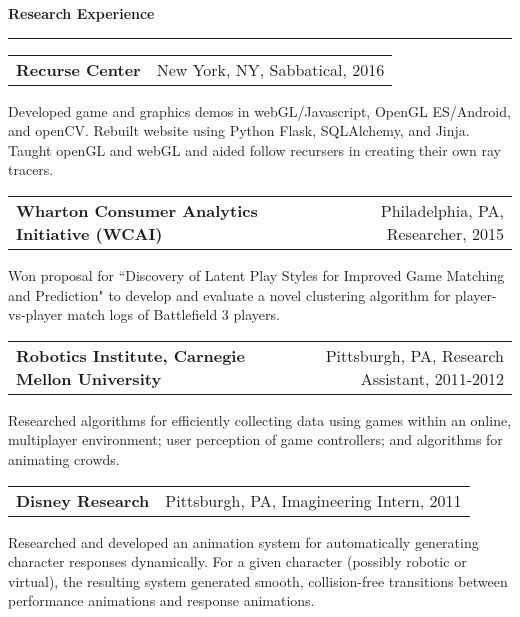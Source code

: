 \needspace{6em}
{\Large {\bf Research Experience}} 
\vspace{0.1cm}
\hrule
\medskip

\needspace{6em}
\begin{tabular*}{7.1in}{@{}l@{\extracolsep\fill}r}
{\large {\bf Recurse Center}} & New York, NY, Sabbatical, 2016\\
\end{tabular*}
Developed game and graphics demos in webGL/Javascript, OpenGL ES/Android, and openCV. Rebuilt website using Python Flask, SQLAlchemy, and Jinja. Taught openGL and webGL and aided follow recursers in creating their own ray tracers.

\medskip


\needspace{6em}
\begin{tabular*}{7.1in}{@{}l@{\extracolsep\fill}r}
   {\large {\bf Wharton Consumer Analytics Initiative (WCAI)}} & Philadelphia, PA, Researcher, 2015\\
\end{tabular*}

Won proposal for ``Discovery of Latent Play Styles for Improved Game Matching and Prediction" to develop and evaluate a novel clustering algorithm for player-vs-player match logs of Battlefield 3 players.

\medskip


\needspace{6em}
\begin{tabular*}{7.1in}{@{}l@{\extracolsep\fill}r}
{\large {\bf Robotics Institute, Carnegie Mellon University}} & Pittsburgh, PA, Research Assistant, 2011-2012\\
\end{tabular*}

Researched algorithms for efficiently collecting data using games within an online, multiplayer environment; user perception of game controllers; and algorithms for animating crowds. 
\medskip

\needspace{6em}
\begin{tabular*}{7.1in}{@{}l@{\extracolsep\fill}r}
{\large {\bf Disney Research}} & Pittsburgh, PA, Imagineering Intern, 2011\\
\end{tabular*}

Researched and developed an animation system for automatically generating character responses dynamically. 
For a given character (possibly robotic or virtual), the resulting system generated 
smooth, collision-free transitions between performance animations and response animations.


